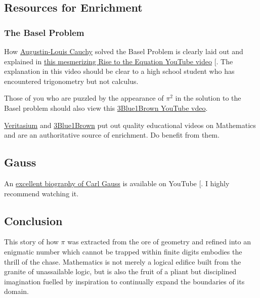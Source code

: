 \documentclass[
  a4paper,
]{article}
\begin{document}
\subsection{Resources for Enrichment}\label{resources-for-enrichment}

\subsubsection{The Basel Problem}\label{the-basel-problem}

How
\href{https://en.wikipedia.org/wiki/Augustin-Louis_Cauchy}{Augustin-Louis
Cauchy} solved the Basel Problem is clearly laid out and explained in
\href{https://www.youtube.com/watch?v=2jgtAo3Ztf}{this mesmerizing Rise
to the Equation YouTube video} {[}\citeproc{ref-cauchy-basel}{30}{]}.
The explanation in this video should be clear to a high school student
who has encountered trigonometry but not calculus.

Those of you who are puzzled by the appearance of \(\pi^2\) in the
solution to the Basel problem should also view this
\href{https://www.youtube.com/watch?v=d-o3eB9sfls}{3Blue1Brown YouTube
vdeo}.

\href{https://www.youtube.com/@veritasium}{Veritasium} and
\href{https://www.youtube.com/c/3blue1brown}{3Blue1Brown} put out
quality educational videos on Mathematics and are an authoritative
source of enrichment. Do benefit from them.

\subsection{Gauss}\label{gauss}

An \href{https://www.youtube.com/watch?v=LmmyAOkajVM}{excellent
biography of Carl Gauss} is available on YouTube
{[}\citeproc{ref-gauss-bio}{31}{]}. I highly recommend watching it.

\subsection{Conclusion}\label{conclusion}

This story of how \(\pi\) was extracted from the ore of geometry and
refined into an enigmatic number which cannot be trapped within finite
digits embodies the thrill of the chase. Mathematics is not merely a
logical edifice built from the granite of unassailable logic, but is
also the fruit of a pliant but disciplined imagination fuelled by
inspiration to continually expand the boundaries of its domain.
\end{document}
